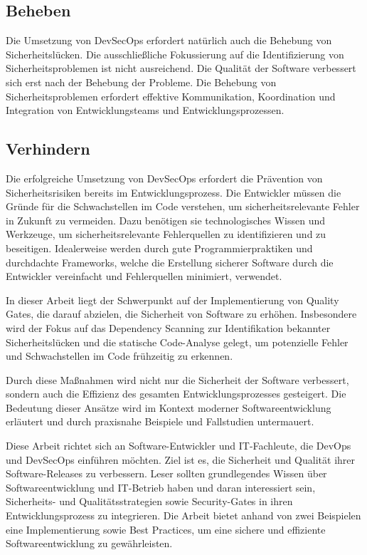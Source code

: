 \subsection{Beheben}
Die Umsetzung von DevSecOps erfordert natürlich auch die Behebung von Sicherheitslücken. Die ausschließliche Fokussierung auf die Identifizierung von Sicherheitsproblemen ist nicht ausreichend. Die Qualität der Software verbessert sich erst nach der Behebung der Probleme. Die Behebung von Sicherheitsproblemen erfordert effektive Kommunikation, Koordination und Integration von Entwicklungsteams und Entwicklungsprozessen.

\subsection{Verhindern}
Die erfolgreiche Umsetzung von DevSecOps erfordert die Prävention von Sicherheitsrisiken bereits im Entwicklungsprozess. Die Entwickler müssen die Gründe für die Schwachstellen im Code verstehen, um sicherheitsrelevante Fehler in Zukunft zu vermeiden. Dazu benötigen sie technologisches Wissen und Werkzeuge, um sicherheitsrelevante Fehlerquellen zu identifizieren und zu beseitigen. Idealerweise werden durch gute Programmierpraktiken und durchdachte Frameworks, welche die Erstellung sicherer Software durch die Entwickler vereinfacht und Fehlerquellen minimiert, verwendet. 

In dieser Arbeit liegt der Schwerpunkt auf der Implementierung von Quality Gates, die darauf abzielen, die Sicherheit von Software zu erhöhen. Insbesondere wird der Fokus auf das Dependency Scanning zur Identifikation bekannter Sicherheitslücken und die statische Code-Analyse gelegt, um potenzielle Fehler und Schwachstellen im Code frühzeitig zu erkennen.

Durch diese Maßnahmen wird nicht nur die Sicherheit der Software verbessert, sondern auch die Effizienz des gesamten Entwicklungsprozesses gesteigert. Die Bedeutung dieser Ansätze wird im Kontext moderner Softwareentwicklung erläutert und durch praxisnahe Beispiele und Fallstudien untermauert.


Diese Arbeit richtet sich an Software-Entwickler und IT-Fachleute, die DevOps und DevSecOps einführen möchten. Ziel ist es, die Sicherheit und Qualität ihrer Software-Releases zu verbessern. Leser sollten grundlegendes Wissen über Softwareentwicklung und IT-Betrieb haben und daran interessiert sein, Sicherheits- und Qualitätsstrategien sowie Security-Gates in ihren Entwicklungsprozess zu integrieren. Die Arbeit bietet anhand von zwei Beispielen eine Implementierung sowie Best Practices, um eine sichere und effiziente  Softwareentwicklung zu gewährleisten.